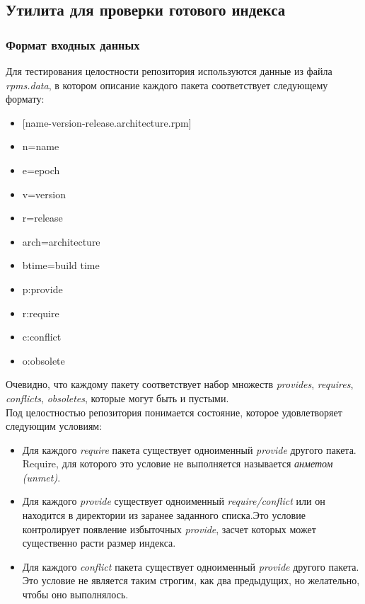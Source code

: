 \subsection{Утилита для проверки готового индекса}
\label{sn:index_test}
\subsubsection{Формат входных данных}
Для тестирования целостности репозитория используются данные из файла \textit{rpms.data},
в котором описание каждого пакета соответствует следующему формату:
\begin{itemize}
\item{[name-version-release.architecture.rpm] }
\item{n=name} 
\item{e=epoch}
\item{v=version}
\item{r=release}
\item{arch=architecture}
\item{btime=build time}
\item{p:provide}
\item{r:require}
\item{c:conflict}
\item{o:obsolete}
\end{itemize}
Очевидно, что каждому пакету соответствует набор множеств \textit{provides},
\textit{requires}, \textit{conflicts}, \textit{obsoletes}, которые могут быть и пустыми.\\

Под целостностью репозитория понимается состояние, которое удовлетворяет следующим
условиям:
\begin{itemize}
\item{Для каждого \textit{require} пакета существует одноименный \textit{provide} 
другого пакета. Require, для которого это условие не выполняется
называется \textit{анметом (unmet)}. }
\item{Для каждого \textit{provide} существует одноименный \textit{require/conflict} или
он находится в директории из заранее заданного списка.Это условие 
контролирует появление избыточных \textit{provide}, засчет которых %
может существенно расти размер индекса.}
\item{Для каждого \textit{conflict} пакета существует одноименный \textit{provide} 
другого пакета. Это условие не является таким строгим, как два предыдущих,
но желательно, чтобы оно выполнялось. }
\end{itemize}

